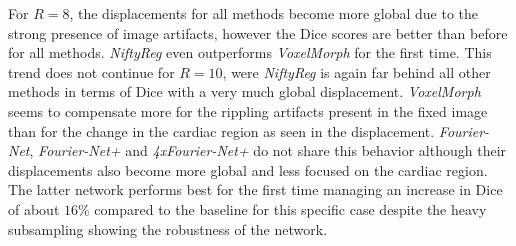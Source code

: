 For $R=8$, the displacements for all methods become more global due to the strong presence of image artifacts, however the Dice scores are better than before for all methods. \emph{NiftyReg} even outperforms \emph{VoxelMorph} for the first time. This trend does not continue for $R=10$, were \emph{NiftyReg} is again far behind all other methods in terms of Dice with a very much global displacement. \emph{VoxelMorph} seems to compensate more for the rippling artifacts present in the fixed image than for the change in the cardiac region as seen in the displacement. \emph{Fourier-Net}, \emph{Fourier-Net+} and \emph{4xFourier-Net+} do not share this behavior although their displacements also become more global and less focused on the cardiac region. The latter network performs best for the first time managing an increase in Dice of about $16\%$ compared to the baseline for this specific case despite the heavy subsampling showing the robustness of the network.

